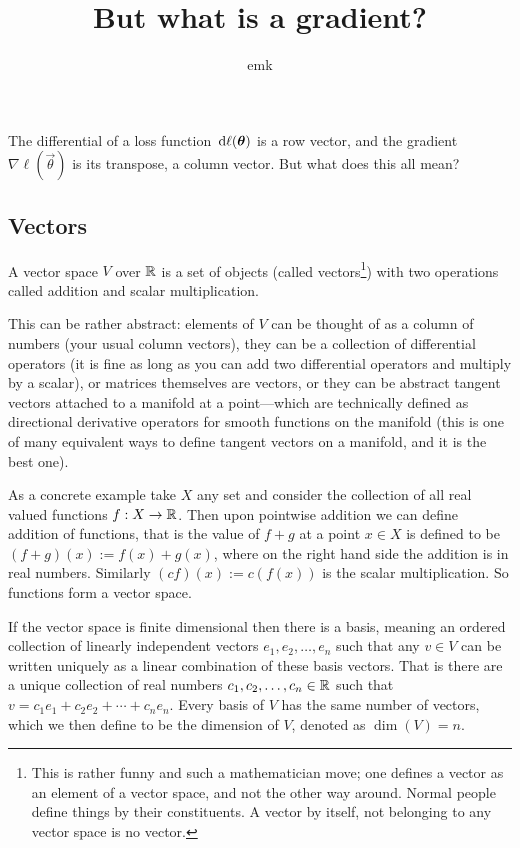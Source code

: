 \documentclass[12pt]{amsart}
\title{But what is a gradient?}
\author{emk}
\begin{document}
\maketitle

The differential of a loss function $\,\mathrm{d} \ell(\mathbf{\boldsymbol{\theta}})$ is a row vector, and the gradient $\nabla\ell(\vec{\theta})$ is its transpose, a column vector. But what does this all mean?


\subsection*{Vectors}
A vector space $V$ over $\mathbb{R}$ is a set of objects (called vectors\footnote{This is rather funny and such a mathematician move; one defines a vector as an element of a vector space, and not the other way around. Normal people define things by their constituents. A vector by itself, not belonging to any vector space is no vector.}) with two operations called addition and scalar multiplication.

This can be rather abstract: elements of $V$ can be thought of as a column of numbers (your usual column vectors), they can be a collection of differential operators (it is fine as long as you can add two differential operators and multiply by a scalar), or matrices themselves are vectors, or they can be abstract tangent vectors attached to a manifold at a point---which are technically defined as directional derivative operators for smooth functions on the manifold (this is one of many equivalent ways to define tangent vectors on a manifold, and it is the best one). 

As a concrete example take $X$ any set and consider the collection of all real valued functions $f: X \to \mathbb{R}$. Then upon pointwise addition we can define addition of functions, that is the value of $f + g$ at a point $x\in X$ is defined to be $(f + g)(x) := f(x) + g(x)$, where on the right hand side the addition is in real numbers. Similarly $(cf)(x) := c(f(x))$ is the scalar multiplication. So functions form a vector space.

If the vector space is finite dimensional then there is a basis, meaning an ordered collection of linearly independent vectors $e_1, e_2, \ldots, e_n$ such that any $v \in V$ can be written uniquely as a linear combination of these basis vectors. That is there are a unique collection of real numbers $c_1, c_2, \ldots, c_n \in \mathbb{R}$ such that $v = c_1 e_1 + c_2 e_2 + \cdots + c_n e_n$. Every basis of $V$ has the same number of vectors, which we then define to be the dimension of $V$, denoted as $\dim(V) = n$. 
\end{document}
